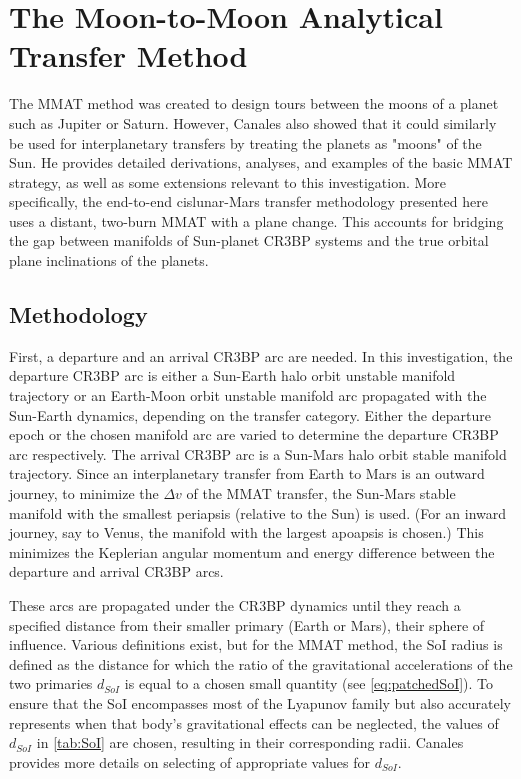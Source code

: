 \section{The Moon-to-Moon Analytical Transfer Method}
The MMAT method was created to design tours between the moons of a planet such as Jupiter or
Saturn. However, Canales also showed that it could similarly be used for interplanetary transfers
by treating the planets as "moons" of the Sun. He provides detailed derivations, analyses, and
examples of the basic MMAT strategy, as well as some extensions relevant to this
investigation\cite{Canales:2021a,Canales:2021b,Canales:2022}. More specifically, the end-to-end
cislunar-Mars transfer methodology presented here uses a distant, two-burn MMAT with a plane
change. This accounts for bridging the gap between manifolds of Sun-planet CR3BP systems and the
true orbital plane inclinations of the planets.

\subsection{Methodology}
First, a departure and an arrival CR3BP arc are needed. In this investigation, the departure CR3BP
arc is either a Sun-Earth halo orbit unstable manifold trajectory or an Earth-Moon orbit unstable
manifold arc propagated with the Sun-Earth dynamics, depending on the transfer category. Either the
departure epoch or the chosen manifold arc are varied to determine the departure CR3BP arc
respectively. The arrival CR3BP arc is a Sun-Mars halo orbit stable manifold trajectory. Since an
interplanetary transfer from Earth to Mars is an outward journey, to minimize the $\Delta v$ of the
MMAT transfer, the Sun-Mars stable manifold with the smallest periapsis (relative to the Sun) is
used\cite{Canales:2021b}. (For an inward journey, say to Venus, the manifold with the largest
apoapsis is chosen.) This minimizes the Keplerian angular momentum and energy difference between
the departure and arrival CR3BP arcs.

These arcs are propagated under the CR3BP dynamics until they reach a specified distance from their
smaller primary (Earth or Mars), their sphere of influence. Various definitions exist, but for the
MMAT method, the SoI radius is defined as the distance for which the ratio of the gravitational
accelerations of the two primaries $d_{SoI}$ is equal to a chosen small quantity (see
\cref{eq:patchedSoI})\cite{Canales:2021b}. To ensure that the SoI encompasses most of the Lyapunov
family but also accurately represents when that body's gravitational effects can be neglected, the
values of $d_{SoI}$ in \cref{tab:SoI} are chosen, resulting in their corresponding radii. Canales
provides more details on selecting of appropriate values for $d_{SoI}$\cite{Canales:2021b}.

